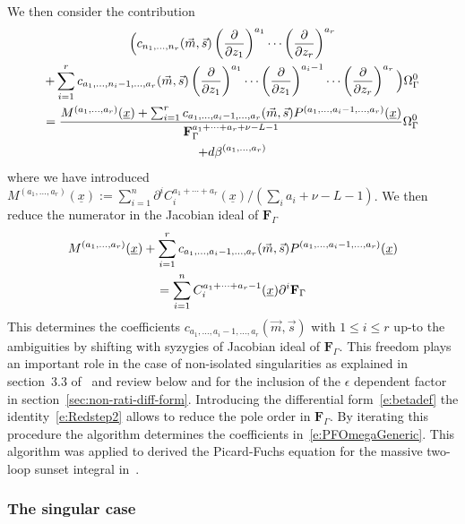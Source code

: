 \documentclass[a4paper,12pt]{article}
\numberwithin{equation}{section}
\numberwithin{figure}{subsection}
\theoremstyle{plain}
\theoremstyle{plain}
\theoremstyle{definition}
\theoremstyle{plain}
\theoremstyle{remark}
\theoremstyle{plain}
\begin{document}
We then consider the contribution
\begin{multline}
  \Big( c_{n_1,\dots,n_r}(\vec m,\vec s)
  \left(\partial\over \partial z_1\right)^{a_1}\cdots\left(\partial
  \over\partial z_r\right)^{a_r} \cr+\sum_{i=1}^r c_{a_1,\dots,n_i-1,\dots,a_r}(\vec m,\vec s)
  \left(\partial\over \partial z_1\right)^{a_1}\cdots  \left(\partial\over \partial z_1\right)^{a_i-1}\cdots\left(\partial
    \over\partial z_r\right)^{a_r} \Big)\Omega_\Gamma^0\cr
  ={M^{(a_1,\dots,a_r)}(\underline x)+\sum_{i=1}^r
    c_{a_1,\dots,a_i-1,\dots,a_r}(\vec m,\vec s)    P^{(a_1,\dots,a_i-1,\dots,a_r)}(\underline x) \over \textbf{F}_\Gamma^{a_1+\cdots+a_r+\nu-L-1}} \Omega_\Gamma^0\cr+d\beta^{(a_1,\dots,a_r)}
\end{multline}
where we have introduced $M^{(a_1,\dots,a_r)}(\underline x):=\sum_{i=1}^n
  \partial^i C^{a_1+\cdots+a_r}_i(\underline x)/ (\sum_i a_i+\nu-L-1)$.
We then reduce the numerator in the Jacobian ideal of
$\textbf{F}_\Gamma$
\begin{multline}\label{e:Redstep2}
    M^{(a_1,\dots,a_r)}(\underline x)+\sum_{i=1}^r
    c_{a_1,\dots,a_i-1,\dots,a_r}(\vec m,\vec s)
    P^{(a_1,\dots,a_i-1,\dots,a_r)}(\underline x) \cr
    =\sum_{i=1}^n
    C^{a_1+\cdots+a_r-1}_i(\underline x)\partial^i \textbf{F}_\Gamma
\end{multline}
%
This determines the coefficients
$c_{a_1,\dots,a_i-1,\dots,a_r}(\vec m,\vec s) $ with $1\leq i\leq r$
up-to the ambiguities by shifting with syzygies of  Jacobian ideal of
$\textbf{F}_\Gamma$.  This freedom plays an important role in the case
of non-isolated singularities as explained in section~3.3 of~\cite{Lairez:2022zkj} and review
below and for the inclusion of the $\epsilon$ dependent factor in section~\ref{sec:non-rati-diff-form}.
Introducing the differential form~\eqref{e:betadef} the
identity~\eqref{e:Redstep2}  allows to reduce the pole order in $\textbf{F}_\Gamma$.
By iterating this procedure the algorithm determines the coefficients
in~\eqref{e:PFOmegaGeneric}. This algorithm was applied to derived the
Picard-Fuchs equation for the massive two-loop sunset integral in~\cite{Bloch:2016izu}.
\subsubsection{The singular case}
\label{sec:singular-case}
\end{document}
